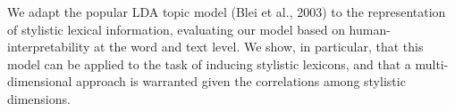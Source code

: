 We adapt the popular LDA topic model (Blei et al., 2003) to the representation of stylistic lexical information, evaluating our model based on
 human-interpretability at the word and text level. We show, in particular, that
 this  model can be applied to the task of inducing stylistic lexicons, and that
 a multi-dimensional approach is warranted given the correlations among
 stylistic dimensions.

